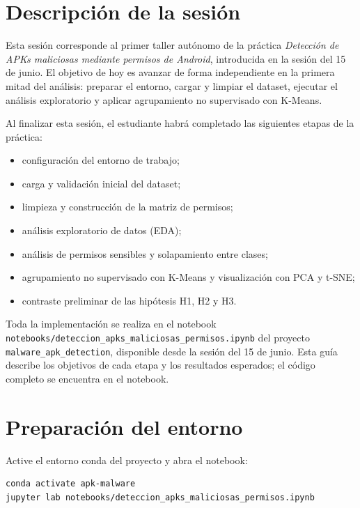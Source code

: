 \documentclass[
  coursetitle={Cómputo Nube y Tecnologías Emergentes},
  coursehours={96},
  coursedate={Verano 2026},
  doctype={Taller},
  otherlangs={english,french},
  authorname={Lázaro},
  authorsurname={Bustio-Martínez},
  authortitle={PhD},
  role={Profesor Investigador},
  email={lbustio@inaoe.mx},
  phone={5559504000},
  ext={7459},
  institution={Instituto Nacional de Astrofísica, Óptica y Electrónica (INAOE)},
  department={Maestría en Ciencias en Tecnologías de Seguridad},
  address={Luis Enrique Erro 1, Sta. Ma. Tonantzintla, San Andrés Cholula, CP 72840, Puebla, México},
  margin={0.5in}
]{../../lbustio_lecture_notes}
\begin{document}
\IberoCover

\section{Descripción de la sesión}

Esta sesión corresponde al primer taller autónomo de la práctica \textit{Detección de APKs maliciosas mediante permisos de Android}, introducida en la sesión del 15 de junio. El objetivo de hoy es avanzar de forma independiente en la primera mitad del análisis: preparar el entorno, cargar y limpiar el dataset, ejecutar el análisis exploratorio y aplicar agrupamiento no supervisado con K-Means.

Al finalizar esta sesión, el estudiante habrá completado las siguientes etapas de la práctica:

\begin{itemize}
    \item configuración del entorno de trabajo;
    \item carga y validación inicial del dataset;
    \item limpieza y construcción de la matriz de permisos;
    \item análisis exploratorio de datos (EDA);
    \item análisis de permisos sensibles y solapamiento entre clases;
    \item agrupamiento no supervisado con K-Means y visualización con PCA y t-SNE;
    \item contraste preliminar de las hipótesis H1, H2 y H3.
\end{itemize}

\begin{tcolorbox}[title=Referencia]
Toda la implementación se realiza en el notebook \texttt{notebooks/deteccion\_apks\_maliciosas\_permisos.ipynb} del proyecto \texttt{malware\_apk\_detection}, disponible desde la sesión del 15 de junio. Esta guía describe los objetivos de cada etapa y los resultados esperados; el código completo se encuentra en el notebook.
\end{tcolorbox}

\section{Preparación del entorno}

Active el entorno conda del proyecto y abra el notebook:

\begin{lstlisting}
conda activate apk-malware
jupyter lab notebooks/deteccion_apks_maliciosas_permisos.ipynb
\end{lstlisting}
\end{document}
